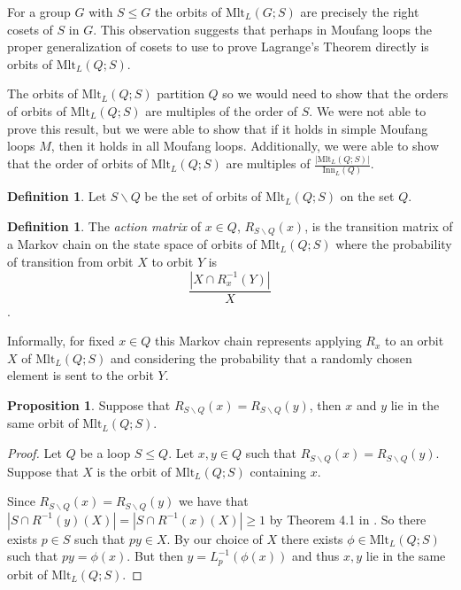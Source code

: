 \documentclass[12pt, twoside, openright]{report}
\theoremstyle{definition}
\newtheorem{prp}[thm]{Proposition}
\newtheorem{dfn}[thm]{Definition}
\newcommand{\ldv}{\backslash}       %
\newcommand{\mlt}{\text{Mlt}}       %
\newcommand{\inn}{\text{Inn}}       %
\begin{document}
For a group $G$ with $S\leq G$ the orbits of $\mlt_L(G; S)$ are precisely the right cosets of $S$ in $G$.
  This observation suggests that perhaps in Moufang loops the proper generalization of cosets to use to
  prove Lagrange's Theorem directly is orbits of $\mlt_L(Q; S)$. 

The orbits of $\mlt_L(Q; S)$ partition $Q$ so we would need to show that the orders of orbits of
  $\mlt_L(Q; S)$ are multiples of the order of $S$. We were not able to prove this result, but we
  were able to show that if it holds in simple Moufang loops $M$, then it holds in all Moufang loops.
  Additionally, we were able to show that the order of orbits of $\mlt_L(Q; S)$ are multiples of
  $\frac{|\mlt_L(Q; S)|}{\inn_L(Q)}$.

\begin{dfn}
  Let $S\ldv Q$ be the set of orbits of $\mlt_L(Q; S)$ on the set $Q$.
\end{dfn}

\begin{dfn}
  The \emph{action matrix} of $x\in Q$, $R_{S\ldv Q}(x)$, is the transition matrix of a Markov chain on
    the state space of orbits of $\mlt_L(Q; S)$ where the probability of transition from orbit $X$
    to orbit $Y$ is
  \[\frac{|X\cap R_x^{-1}(Y)|}{X}\]
  \cite{Smith}.
\end{dfn}

Informally, for fixed $x\in Q$ this Markov chain represents applying $R_x$ to an orbit $X$ of $\mlt_L(Q; S)$
  and considering the probability that a randomly chosen element is sent to the orbit $Y$.

\begin{prp}
  Suppose that $R_{S\ldv Q}(x) = R_{S\ldv Q}(y)$, then $x$ and $y$ lie in the same orbit of $\mlt_L(Q; S)$.
\end{prp}

\begin{proof}
  Let $Q$ be a loop $S\leq Q$. Let $x, y\in Q$ such that $R_{S\ldv Q}(x) = R_{S\ldv Q}(y)$. Suppose that $X$
    is the orbit of $\mlt_L(Q; S)$ containing $x$.

  Since $R_{S\ldv Q}(x) = R_{S\ldv Q}(y)$ we have that $|S\cap R^{-1}(y)(X)| = |S\cap R^{-1}(x)(X)| \geq 1$
    by Theorem 4.1 in \cite{Smith}. So there exists $p\in S$ such that $py \in X$. By our choice of $X$
    there exists $\phi\in\mlt_L(Q; S)$ such that $py = \phi(x)$. But then $y = L_p^{-1}(\phi(x))$ and
    thus $x, y$ lie in the same orbit of $\mlt_L(Q; S)$.
\end{proof}
\end{document}
